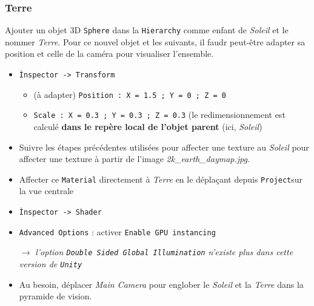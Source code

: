 \documentclass[a4paper,10pt]{article}
\newenvironment{solution}%
{\begin{tcolorbox}[breakable,colback=red!5!white,colframe=red!75!black,title=Solution]}%
{\end{tcolorbox}}
\begin{document}
\ifversionenseignant
\begin{solution}
\subsubsection{Terre}
Ajouter un objet 3D \texttt{Sphere} dans la \texttt{Hierarchy} comme enfant de \textit{Soleil} et le nommer \textit{Terre}. Pour ce nouvel objet et les suivants, il faudr peut-être adapter sa position et celle de la caméra pour visualiser l'ensemble.
\begin{itemize}
	\item \texttt{Ìnspector -> Transform}
	\begin{itemize}
		\item (à adapter) \texttt{Position : X = 1.5 ; Y = 0 ; Z = 0} 
		\item \texttt{Scale : X = 0.3 ; Y = 0.3 ; Z = 0.3} (le redimensionnement est calculé \textbf{dans le repère local de l'objet parent} (ici, \textit{Soleil})		
	\end{itemize}
\item Suivre les étapes précédentes utilisées pour affecter une texture au \textit{Soleil} pour affecter une texture à partir de l'image \textit{2k\_earth\_daymap.jpg}.
\item Affecter ce \texttt{Material} directement à \textit{Terre} en le déplaçant depuis \texttt{Project}sur la vue centrale
\item \texttt{Ìnspector -> Shader}
\item \texttt{Advanced Options} : activer \texttt{Enable GPU instancing} 
\item[$\rightarrow$] \textit{l'option \texttt{Double Sided Global Illumination} n'existe plus dans cette version de \texttt{Unity}}
\item Au besoin, déplacer \textit{Main Camera} pour englober le \textit{Soleil} et la \textit{Terre} dans la pyramide de vision.
\end{itemize}


\end{solution}
\end{document}
